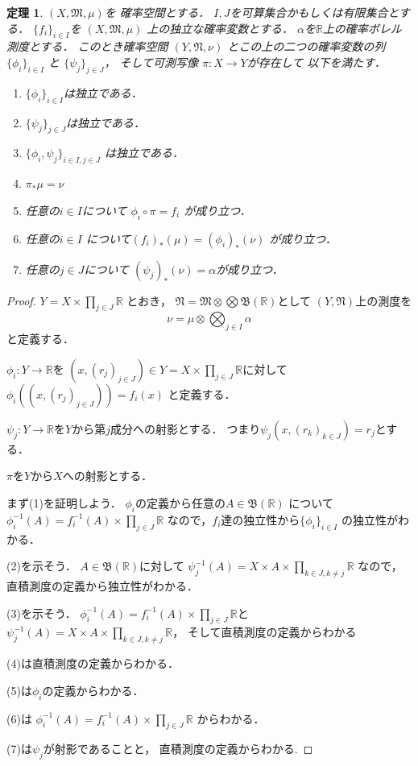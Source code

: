 \documentclass[leqno, 12pt]{jsarticle}
\newtheorem{thm}{定理}
\newcommand{\rr}{\mathbb{R}}
\begin{document}
\begin{thm}
$(X, \mathfrak{M}, \mu)$を
確率空間とする．
$I, J$を可算集合かもしくは有限集合とする．
$\{f_{i}\}_{i\in I}$を
$(X, \mathfrak{M}, \mu)$
上の独立な確率変数とする．
$\alpha$を$\rr$上の確率ボレル測度とする．
このとき確率空間
$(Y, \mathfrak{N}, \nu)$
とこの上の二つの確率変数の列
$\{\phi_{i}\}_{i\in I}$
と
$\{\psi_{j}\}_{j\in J}$，
そして可測写像
$\pi: X\to Y$が存在して
以下を満たす．
\begin{enumerate}
\item $\{\phi_{i}\}_{i\in I}$は独立である．
\item 
$\{\psi_{j}\}_{j\in J}$は独立である．

\item $\{\phi_{i}, \psi_{j}\}_{i\in I, j\in J}$
は独立である．
\item 
$\pi_{*}\mu=\nu$
\item 
任意の$i\in I$について
$\phi_{i}\circ \pi=f_{i}$
が成り立つ．
\item 任意の$i\in I$
について$(f_{i})_{*}(\mu)=(\phi_{i})_{*}(\nu)$
が成り立つ．
\item 
任意の$j\in J$について
$(\psi_{j})_{*}(\nu)=\alpha$が成り立つ．
\end{enumerate}
\end{thm}
\begin{proof}
$Y=X\times \prod_{j\in J}\rr$
とおき，
$\mathfrak{N}=\mathfrak{M}\otimes \bigotimes\mathfrak{B}(\rr)$として
$(Y, \mathfrak{N})$上の測度を
\[
\nu=\mu\otimes \bigotimes_{j\in I}\alpha
\]
と定義する．

$\phi_{i}: Y\to \rr$を
$(x, (r_{j})_{j\in J})\in Y=X\times \prod_{j\in J}\rr$に対して
$\phi_{i}((x, (r_{j})_{j\in J}))=f_{i}(x)$
と定義する．

$\psi_{j}: Y\to \rr$を$Y$から第$j$成分への射影とする．
つまり$\psi_{j}(x, (r_{k})_{k\in J})=r_{j}$とする．

$\pi$を$Y$から$X$への射影とする．

まず(1)を証明しよう．
$\phi_{i}$の定義から任意の$A\in \mathfrak{B}(\rr)$
について
$\phi_{i}^{-1}(A)=f_{i}^{-1}(A)\times \prod_{j\in J}\rr$
なので，$f_{i}$達の独立性から$\{\phi_{i}\}_{i\in I}$
の独立性がわかる．

(2)を示そう．
$A\in \mathfrak{B}(\rr)$に対して
$\psi_{j}^{-1}(A)=X\times A\times \prod_{k\in J, k\neq j}\rr$
なので，直積測度の定義から独立性がわかる．

(3)を示そう．
$\phi_{i}^{-1}(A)=f_{i}^{-1}(A)\times \prod_{j\in J}\rr$と
$\psi_{j}^{-1}(A)=X\times A\times \prod_{k\in J, k\neq j}\rr$，
そして直積測度の定義からわかる

(4)は直積測度の定義からわかる．

(5)は$\phi_{i}$の定義からわかる．

(6)は
$\phi_{i}^{-1}(A)=f_{i}^{-1}(A)\times \prod_{j\in J}\rr$
からわかる．

(7)は$\psi_{j}$が射影であることと，
直積測度の定義からわかる.


\end{proof}
\end{document}
